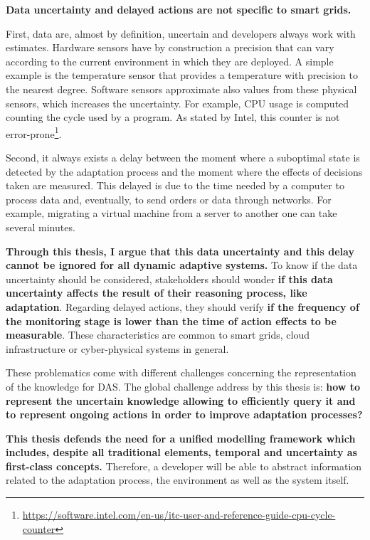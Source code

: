 \bigskip
{}
\textbf{Data uncertainty and delayed actions are not specific to smart grids.}

First, data are, almost by definition, uncertain and developers always work with estimates.
Hardware sensors have by construction a precision that can vary according to the current environment in which they are deployed.
A simple example is the temperature sensor that provides a temperature with precision to the nearest degree.
Software sensors approximate also values from these physical sensors, which increases the uncertainty.
For example, CPU usage is computed counting the cycle used by a program.
As stated by Intel, this counter is not error-prone\footnote{\url{https://software.intel.com/en-us/itc-user-and-reference-guide-cpu-cycle-counter}}.

Second, it always exists a delay between the moment where a suboptimal state is detected by the adaptation process and the moment where the effects of decisions taken are measured.
This delayed is due to the time needed by a computer to process data and, eventually, to send orders or data through networks.
For example, migrating a virtual machine from a server to another one can take several minutes.

\textbf{Through this thesis, I argue that this data uncertainty and this delay cannot be ignored for all dynamic adaptive systems.}
To know if the data uncertainty should be considered, stakeholders should wonder \textbf{if this data uncertainty affects the result of their reasoning process, like adaptation}.
Regarding delayed actions, they should verify \textbf{if the frequency of the monitoring stage is lower than the time of action effects to be measurable}.
These characteristics are common to smart grids, cloud infrastructure or cyber-physical systems in general.

\bigskip
{}
These problematics come with different challenges concerning the representation of the knowledge for DAS.
The global challenge address by this thesis is: \textbf{how to represent the uncertain knowledge allowing to efficiently query it and to represent ongoing actions in order to improve adaptation processes?}

\bigskip
{}
\textbf{This thesis defends the need for a unified modelling framework which includes, despite all traditional elements, temporal and uncertainty as first-class concepts.}
Therefore, a developer will be able to abstract information related to the adaptation process, the environment as well as the system itself.

